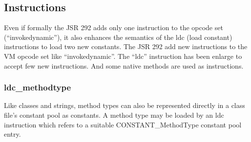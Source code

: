 \documentclass{sigplanconf}
\def \Jsr{\ac{JSR}\xspace}
\def \JSR{\Jsr 292\xspace}
\def \VM{\ac{VM}\xspace}
\begin{document}
% 
% 


    \subsection{Instructions}
      Even if formally the \JSR adds only one instruction to the opcode set (``invokedynamic''),
      it also enhances the semantics of the ldc (load constant) instructions to load two new constants.
      The \JSR add new instructions to the \VM opcode set like ``invokedynamic''.
      The ``ldc'' instruction has been enlarge to accept few new instructions.
      And some native methods are used as instructions.

      \subsubsection{ldc\_methodtype}
        Like classes and strings, method types can also be
        represented directly in a class file's constant pool as constants.
        A method type may be loaded by an ldc instruction which refers to a suitable
        CONSTANT\_MethodType constant pool entry.
\end{document}
